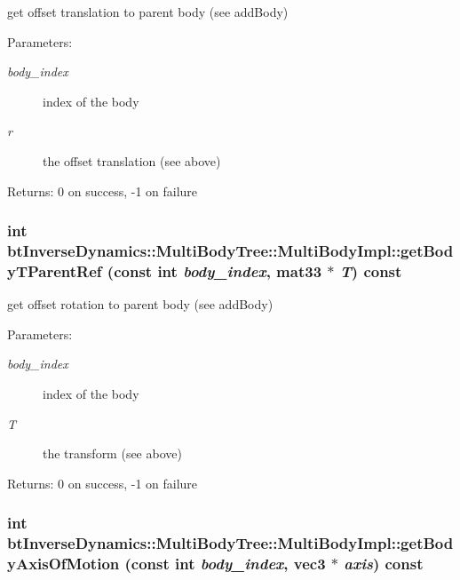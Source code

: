 get offset translation to parent body (see addBody) \begin{Desc}
\item[Parameters:]
\begin{description}
\item[{\em body\_\-index}]index of the body \item[{\em r}]the offset translation (see above) \end{description}
\end{Desc}
\begin{Desc}
\item[Returns:]0 on success, -1 on failure \end{Desc}
 \hypertarget{classbt_inverse_dynamics_1_1_multi_body_tree_1_1_multi_body_impl_e42c54a737ebba57e2d0e30f4cce7af4}{
\subsubsection[getBodyTParentRef]{\setlength{\rightskip}{0pt plus 5cm}int btInverseDynamics::MultiBodyTree::MultiBodyImpl::getBodyTParentRef (const int {\em body\_\-index}, \/  mat33 $\ast$ {\em T}) const}}
\label{classbt_inverse_dynamics_1_1_multi_body_tree_1_1_multi_body_impl_e42c54a737ebba57e2d0e30f4cce7af4}


get offset rotation to parent body (see addBody) \begin{Desc}
\item[Parameters:]
\begin{description}
\item[{\em body\_\-index}]index of the body \item[{\em T}]the transform (see above) \end{description}
\end{Desc}
\begin{Desc}
\item[Returns:]0 on success, -1 on failure \end{Desc}
 \hypertarget{classbt_inverse_dynamics_1_1_multi_body_tree_1_1_multi_body_impl_3a0e4f72e0c1f41332e738014fd5f257}{
\subsubsection[getBodyAxisOfMotion]{\setlength{\rightskip}{0pt plus 5cm}int btInverseDynamics::MultiBodyTree::MultiBodyImpl::getBodyAxisOfMotion (const int {\em body\_\-index}, \/  {\bf vec3} $\ast$ {\em axis}) const}}
\label{classbt_inverse_dynamics_1_1_multi_body_tree_1_1_multi_body_impl_3a0e4f72e0c1f41332e738014fd5f257}


